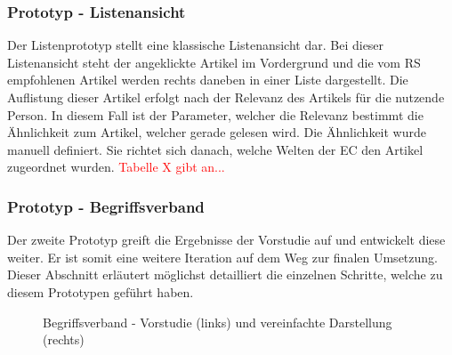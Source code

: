 \subsubsection{Prototyp - Listenansicht}
Der Listenprototyp stellt eine klassische Listenansicht dar.
Bei dieser Listenansicht steht der angeklickte Artikel im Vordergrund und die vom \ac{RS} empfohlenen Artikel werden rechts daneben in einer Liste dargestellt.
Die Auflistung dieser Artikel erfolgt nach der Relevanz des Artikels für die nutzende Person.
In diesem Fall ist der Parameter, welcher die Relevanz bestimmt die Ähnlichkeit zum Artikel, welcher gerade gelesen wird.
Die Ähnlichkeit wurde manuell definiert.
Sie richtet sich danach, welche Welten der \ac{EC} den Artikel zugeordnet wurden.
\textcolor{red}{Tabelle X gibt an...}

\subsubsection{Prototyp - Begriffsverband}
Der zweite Prototyp greift die Ergebnisse der Vorstudie auf und entwickelt diese weiter.
Er ist somit eine weitere Iteration auf dem Weg zur finalen Umsetzung.
Dieser Abschnitt erläutert möglichst detailliert die einzelnen Schritte, welche zu diesem Prototypen geführt haben.\\

\begin{figure}[!ht]
    \centering
    \caption{Begriffsverband - Vorstudie (links) und vereinfachte Darstellung (rechts)}
    \label{fig:industry-comparison}
\end{figure}

